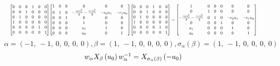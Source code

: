 \documentclass[11pt]{article}
\theoremstyle{definition}
\begin{document}
\[
\scaletoalign{\textwidth}{{\left[\begin{matrix}0 & 0 & 0 & 1 & 0 & 0\\0 & 0 & 1 & 0 & 0 & 0\\0 & 1 & 0 & 0 & 0 & 0\\1 & 0 & 0 & 0 & 0 & 0\\0 & 0 & 0 & 0 & 1 & 0\\0 & 0 & 0 & 0 & 0 & 1\end{matrix}\right]} {\left[\begin{matrix}1 & 0 & 0 & 0 & 0 & 0\\0 & 1 & 0 & - \frac{c_{0} u_{1}^{2}}{2} - \frac{c_{1} u_{0}^{2}}{2} & - c_{0} u_{1} & - c_{1} u_{0}\\0 & 0 & 1 & 0 & 0 & 0\\0 & 0 & 0 & 1 & 0 & 0\\0 & 0 & 0 & u_{1} & 1 & 0\\0 & 0 & 0 & u_{0} & 0 & 1\end{matrix}\right]} {\left[\begin{matrix}0 & 0 & 0 & 1 & 0 & 0\\0 & 0 & 1 & 0 & 0 & 0\\0 & 1 & 0 & 0 & 0 & 0\\1 & 0 & 0 & 0 & 0 & 0\\0 & 0 & 0 & 0 & 1 & 0\\0 & 0 & 0 & 0 & 0 & 1\end{matrix}\right]} = {\left[\begin{matrix}1 & 0 & 0 & 0 & 0 & 0\\0 & 1 & 0 & 0 & 0 & 0\\- \frac{c_{0} u_{1}^{2}}{2} - \frac{c_{1} u_{0}^{2}}{2} & 0 & 1 & 0 & - c_{0} u_{1} & - c_{1} u_{0}\\0 & 0 & 0 & 1 & 0 & 0\\u_{1} & 0 & 0 & 0 & 1 & 0\\u_{0} & 0 & 0 & 0 & 0 & 1\end{matrix}\right]}}
\]
\[
\alpha = \left( -1, \  -1, \  0, \  0, \  0, \  0\right), \beta = \left( 1, \  -1, \  0, \  0, \  0, \  0\right), \sigma_{\alpha}(\beta) = \left( 1, \  -1, \  0, \  0, \  0, \  0\right)
\]
\[
\scaletoalign{\textwidth}{w_{\alpha} X_{\beta}\left(u_{0}\right) w_{\alpha}^{-1} = X_{\sigma_{\alpha}\left(\beta\right)}\left(- u_{0}\right)}
\]
\end{document}
